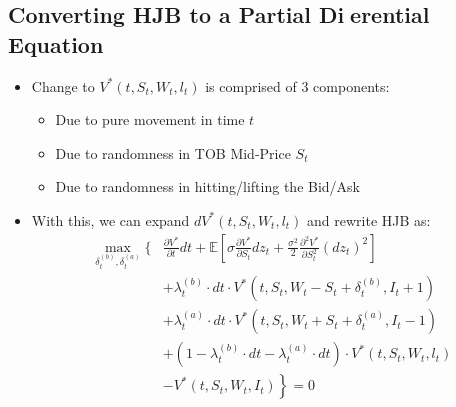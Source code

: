 \documentclass[10pt]{article}
\begin{document}
\subsection{Converting HJB to a Partial Dierential Equation}

\begin{itemize} 
    \item Change to $V^{*}\left(t, S_{t}, W_{t}, l_{t}\right)$ is comprised of 3 components:
    \begin{itemize} 
        \item Due to pure movement in time $t$
        \item Due to randomness in TOB Mid-Price $S_{t}$
        \item Due to randomness in hitting/lifting the Bid/Ask
    \end{itemize}
    \item With this, we can expand $d V^{*}\left(t, S_{t}, W_{t}, l_{t}\right)$ and rewrite HJB as:
    $$
    \begin{aligned}
    \max _{\delta_{t}^{(b)}, \delta_{t}^{(a)}}\{& \frac{\partial V^{*}}{\partial t} d t+\mathbb{E}\left[\sigma \frac{\partial V^{*}}{\partial S_{t}} d z_{t}+\frac{\sigma^{2}}{2} \frac{\partial^{2} V^{*}}{\partial S_{t}^{2}}\left(d z_{t}\right)^{2}\right] \\
    &+\lambda_{t}^{(b)} \cdot d t \cdot V^{*}\left(t, S_{t}, W_{t}-S_{t}+\delta_{t}^{(b)}, I_{t}+1\right) \\
    &+\lambda_{t}^{(a)} \cdot d t \cdot V^{*}\left(t, S_{t}, W_{t}+S_{t}+\delta_{t}^{(a)}, I_{t}-1\right) \\
    &+\left(1-\lambda_{t}^{(b)} \cdot d t-\lambda_{t}^{(a)} \cdot d t\right) \cdot V^{*}\left(t, S_{t}, W_{t}, l_{t}\right) \\
    &\left.-V^{*}\left(t, S_{t}, W_{t}, I_{t}\right)\right\}=0
    \end{aligned}
    $$
\end{itemize}
\end{document}
